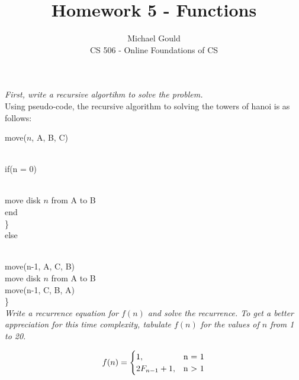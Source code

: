 \documentclass[10pt]{article}
\newcommand\tab[1][1cm]{\hspace*{#1}}
\begin{document}
\title{Homework 5 - Functions}
\author{Michael Gould\\ 
CS 506 - Online Foundations of CS}

\maketitle
\textit{First, write a recursive algortihm to solve the problem.}\\

Using pseudo-code, the recursive algorithm to solving the towers of hanoi is as follows:

move($n$, A, B, C){\\
\tab if(n = 0){\\
\tab\tab move disk $n$ from A to B\\
\tab\tab end\\
\tab\}\\
\tab else {\\
\tab\tab move(n-1, A, C, B)\\
\tab\tab move disk $n$ from A to B\\
\tab\tab move(n-1, C, B, A)\\
\tab\}\\

\textit{Write a recurrence equation for $f(n)$ and solve the
recurrence. To get a better appreciation for this time complexity, tabulate $f(n)$ for the values of $n$ from 1
to 20.}

\begin{equation}
  f(n)=\begin{cases}
    1, & $n = 1$\\
    2F_{n-1} + 1, & $n $>$ 1$\\
  \end{cases}
\end{equation}

}}}
\end{document}
